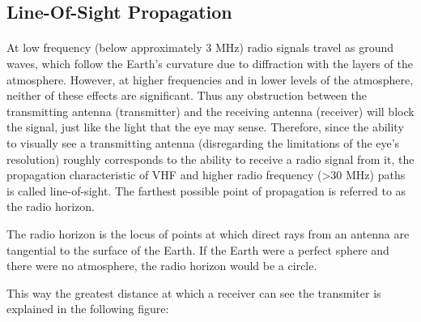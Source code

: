 \subsection*{Line-Of-Sight Propagation}
\paragraph{}
At low frequency (below approximately 3 MHz) radio signals travel as ground waves, which follow the Earth's curvature due to diffraction with the layers of the atmosphere.
However, at higher frequencies and in lower levels of the atmosphere, neither of these effects are significant. Thus any obstruction between the transmitting antenna (transmitter) and the receiving antenna (receiver) will block the signal, just like the light that the eye may sense. Therefore, since the ability to visually see a transmitting antenna (disregarding the limitations of the eye's resolution) roughly corresponds to the ability to receive a radio signal from it, the propagation characteristic of VHF and higher radio frequency (>30 MHz) paths is called line-of-sight. The farthest possible point of propagation is referred to as the radio horizon.

The radio horizon is the locus of points at which direct rays from an antenna are tangential to the surface of the Earth. If the Earth were a perfect sphere and there were no atmosphere, the radio horizon would be a circle.

This way the greatest distance at which a receiver can see the transmiter is explained in the following figure:

% 	
